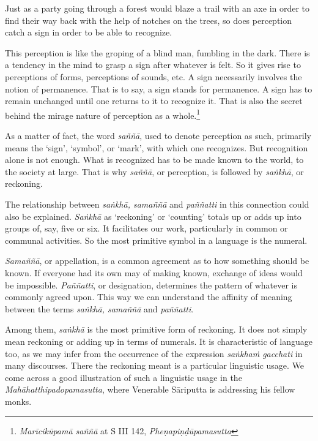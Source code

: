 Just as a party going through a forest would blaze a trail with an axe in order to find their way back with the help of notches on the trees, so does perception catch a sign in order to be able to recognize.

\enlargethispage{2\baselineskip}

This perception is like the groping of a blind man, fumbling in the dark. There is a tendency in the mind to grasp a sign after whatever is felt. So it gives rise to perceptions of forms, perceptions of sounds, etc. A sign necessarily involves the notion of permanence. That is to say, a sign stands for permanence. A sign has to remain unchanged until one returns to it to recognize it. That is also the secret behind the mirage nature of perception as a whole.\footnote{\emph{Marīcikūpamā saññā} at S III 142, \emph{Pheṇapiṇḍūpamasutta}}

As a matter of fact, the word \emph{saññā}, used to denote perception as such, primarily means the `sign', `symbol', or `mark', with which one recognizes. But recognition alone is not enough. What is recognized has to be made known to the world, to the society at large. That is why \emph{saññā}, or perception, is followed by \emph{saṅkhā}, or reckoning.

The relationship between \emph{saṅkhā, samaññā} and \emph{paññatti} in this connection could also be explained. \emph{Saṅkhā} as `reckoning' or `counting' totals up or adds up into groups of, say, five or six. It facilitates our work, particularly in common or communal activities. So the most primitive symbol in a language is the numeral.

\emph{Samaññā}, or appellation, is a common agreement as to how something should be known. If everyone had its own may of making known, exchange of ideas would be impossible. \emph{Paññatti}, or designation, determines the pattern of whatever is commonly agreed upon. This way we can understand the affinity of meaning between the terms \emph{saṅkhā, samaññā} and \emph{paññatti}.

Among them, \emph{saṅkhā} is the most primitive form of reckoning. It does not simply mean reckoning or adding up in terms of numerals. It is characteristic of language too, as we may infer from the occurrence of the expression \emph{saṅkhaṁ gacchati} in many discourses. There the reckoning meant is a particular linguistic usage. We come across a good illustration of such a linguistic usage in the \emph{Mahāhatthipadopamasutta}, where Venerable Sāriputta is addressing his fellow monks.


